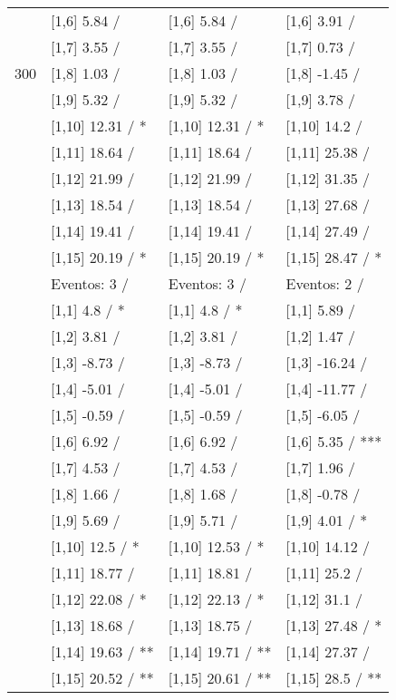 \begin{table}
\begin{tabular}[t]{llll}
 & {}[1,6] 5.84  / & {}[1,6] 5.84  / & {}[1,6] 3.91  /\\
 & {}[1,7] 3.55  / & {}[1,7] 3.55  / & {}[1,7] 0.73  /\\
300 & {}[1,8] 1.03  / & {}[1,8] 1.03  / & {}[1,8] -1.45  /\\
\addlinespace
 & {}[1,9] 5.32  / & {}[1,9] 5.32  / & {}[1,9] 3.78  /\\
 & {}[1,10] 12.31  / * & {}[1,10] 12.31  / * & {}[1,10] 14.2  /\\
 & {}[1,11] 18.64  / & {}[1,11] 18.64  / & {}[1,11] 25.38  /\\
 & {}[1,12] 21.99  / & {}[1,12] 21.99  / & {}[1,12] 31.35  /\\
 & {}[1,13] 18.54  / & {}[1,13] 18.54  / & {}[1,13] 27.68  /\\
\addlinespace
 & {}[1,14] 19.41  / & {}[1,14] 19.41  / & {}[1,14] 27.49  /\\
 & {}[1,15] 20.19  / * & {}[1,15] 20.19  / * & {}[1,15] 28.47  / *\\
 & Eventos:  3 / & Eventos:  3 / & Eventos:  2 /\\
 & {}[1,1] 4.8  / * & {}[1,1] 4.8  / * & {}[1,1] 5.89  /\\
 & {}[1,2] 3.81  / & {}[1,2] 3.81  / & {}[1,2] 1.47  /\\
\addlinespace
 & {}[1,3] -8.73  / & {}[1,3] -8.73  / & {}[1,3] -16.24  /\\
 & {}[1,4] -5.01  / & {}[1,4] -5.01  / & {}[1,4] -11.77  /\\
 & {}[1,5] -0.59  / & {}[1,5] -0.59  / & {}[1,5] -6.05  /\\
 & {}[1,6] 6.92  / & {}[1,6] 6.92  / & {}[1,6] 5.35  / ***\\
 & {}[1,7] 4.53  / & {}[1,7] 4.53  / & {}[1,7] 1.96  /\\
\addlinespace
500 & {}[1,8] 1.66  / & {}[1,8] 1.68  / & {}[1,8] -0.78  /\\
 & {}[1,9] 5.69  / & {}[1,9] 5.71  / & {}[1,9] 4.01  / *\\
 & {}[1,10] 12.5  / * & {}[1,10] 12.53  / * & {}[1,10] 14.12  /\\
 & {}[1,11] 18.77  / & {}[1,11] 18.81  / & {}[1,11] 25.2  /\\
 & {}[1,12] 22.08  / * & {}[1,12] 22.13  / * & {}[1,12] 31.1  /\\
\addlinespace
 & {}[1,13] 18.68  / & {}[1,13] 18.75  / & {}[1,13] 27.48  / *\\
 & {}[1,14] 19.63  / ** & {}[1,14] 19.71  / ** & {}[1,14] 27.37  /\\
 & {}[1,15] 20.52  / ** & {}[1,15] 20.61  / ** & {}[1,15] 28.5  / **\\
\bottomrule
\end{tabular}
\end{table}
